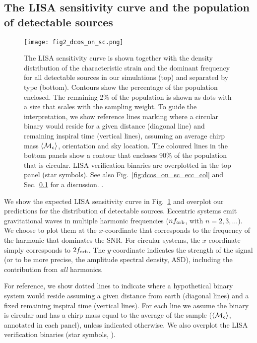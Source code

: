 \subsection{The LISA sensitivity curve and the population of detectable sources}\label{sec:dcos_on_sc}
\begin{figure*}[p]
    \centering
    \texttt{[image: fig2\_dcos\_on\_sc.png]}
    \caption{The LISA sensitivity curve is shown together with the density distribution of the characteristic strain and the dominant frequency for all detectable sources in our simulations (top) and separated by type (bottom). Contours show the percentage of the population enclosed. The remaining 2\% of the population is shown as dots with a size that scales with the sampling weight. To guide the interpretation, we show reference lines marking where a circular binary would reside for a given distance (diagonal line) and remaining inspiral time (vertical lines), assuming an average chirp mass $\left\langle\mathcal{M}_c\right\rangle$, orientation and sky location. The coloured lines in the bottom panels show a contour that encloses 90\% of the population that is circular. LISA verification binaries are overplotted in the top panel (star symbols).  See also Fig.~\ref{fig:dcos_on_sc_ecc_col} and Sec.~\ref{sec:dcos_on_sc} for a discussion. \href{https://github.com/TomWagg/detecting-DCOs-in-LISA/blob/main/paper/figures/fig2_dcos_on_sc.png}{\faFileImage} \href{https://github.com/TomWagg/detecting-DCOs-in-LISA/blob/main/paper/figure_notebooks/sensitivity_curve.ipynb}{\faBook}.}
    \label{fig:dcos_on_sc}
\end{figure*}
We show the expected LISA sensitivity curve \citep{Robson+2019} in Fig.~\ref{fig:dcos_on_sc} and overplot our predictions for the distribution of detectable sources. Eccentric systems emit gravitational waves in multiple harmonic frequencies ($n f_{\rm orb}$, with $n = 2, 3, \dots $). We choose to plot them at the $x$-coordinate that corresponds to the frequency of the harmonic that dominates the SNR. For circular systems, the $x$-coordinate simply corresponds to $2 f_{\rm orb}$. The $y$-coordinate indicates the strength of the signal (or to be more precise, the amplitude spectral density, ASD), including the contribution from \textit{all} harmonics.

For reference, we show dotted lines to indicate where a hypothetical binary system would reside assuming a given distance from earth (diagonal lines) and a fixed remaining inspiral time (vertical lines). For each line we assume the binary is circular and has a chirp mass equal to the average of the sample ($\left\langle\mathcal{M}_c\right\rangle$, annotated in each panel), unless indicated otherwise. We also overplot the LISA verification binaries (star symbols, \citealt{Kupfer+2018}).

